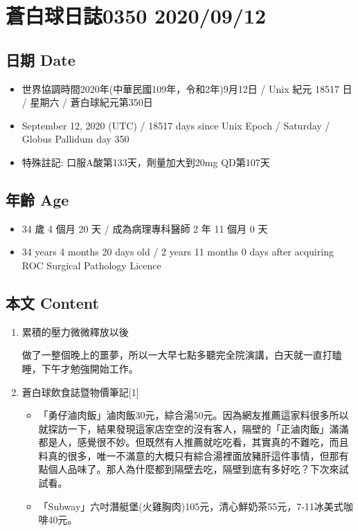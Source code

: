 \documentclass[a5paper, 11pt
]{book}
\providecommand{\tightlist}{%
  \setlength{\itemsep}{0pt}\setlength{\parskip}{0pt}}
\begin{document}
\hypertarget{ux84bcux767dux7403ux65e5ux8a8c0350-20200912}{%
\section{蒼白球日誌0350
2020/09/12}\label{ux84bcux767dux7403ux65e5ux8a8c0350-20200912}}

\hypertarget{ux65e5ux671f-date-11}{%
\subsection{日期 Date}\label{ux65e5ux671f-date-11}}

\begin{itemize}
\tightlist
\item
  世界協調時間2020年(中華民國109年，令和2年)9月12日 / Unix 紀元 18517 日
  / 星期六 / 蒼白球紀元第350日
\item
  September 12, 2020 (UTC) / 18517 days since Unix Epoch / Saturday /
  Globus Pallidum day 350
\item
  特殊註記: 口服A酸第133天，劑量加大到20mg QD第107天
\end{itemize}

\hypertarget{ux5e74ux9f61-age-11}{%
\subsection{年齡 Age}\label{ux5e74ux9f61-age-11}}

\begin{itemize}
\tightlist
\item
  34 歲 4 個月 20 天 / 成為病理專科醫師 2 年 11 個月 0 天
\item
  34 years 4 months 20 days old / 2 years 11 months 0 days after
  acquiring ROC Surgical Pathology Licence
\end{itemize}

\hypertarget{ux672cux6587-content-11}{%
\subsection{本文 Content}\label{ux672cux6587-content-11}}

\begin{enumerate}
\def\labelenumi{\arabic{enumi}.}
\item
  累積的壓力微微釋放以後

  做了一整個晚上的噩夢，所以一大早七點多聽完全院演講，白天就一直打瞌睡，下午才勉強開始工作。
\item
  蒼白球飲食誌暨物價筆記{[}1{]}

  \begin{itemize}
  \tightlist
  \item
    「勇仔滷肉飯」滷肉飯30元，綜合湯50元。因為網友推薦這家料很多所以就探訪一下，結果發現這家店空空的沒有客人，隔壁的「正滷肉飯」滿滿都是人，感覺很不妙。但既然有人推薦就吃吃看，其實真的不難吃，而且料真的很多，唯一不滿意的大概只有綜合湯裡面放豬肝這件事情，但那有點個人品味了。那人為什麼都到隔壁去吃，隔壁到底有多好吃？下次來試試看。
  \item
    「Subway」六吋潛艇堡(火雞胸肉)105元，清心鮮奶茶55元，7-11冰美式咖啡40元。
  \end{itemize}
\end{enumerate}
\end{document}
